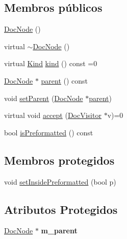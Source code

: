 \subsection*{Membros públicos}
\begin{DoxyCompactItemize}
\item 
\hyperlink{class_doc_node_a85b3e7c9c197e48f2b210b668ea5aec4}{Doc\-Node} ()
\item 
virtual \hyperlink{class_doc_node_a64df84e99c9f1fb86ee5e3cf58c434ce}{$\sim$\-Doc\-Node} ()
\item 
virtual \hyperlink{class_doc_node_aa10c9e8951b8ccf714a59ec321bdac5b}{Kind} \hyperlink{class_doc_node_a27e5d1dde6c9e861b52afa5a95f71d2d}{kind} () const =0
\item 
\hyperlink{class_doc_node}{Doc\-Node} $\ast$ \hyperlink{class_doc_node_abd7f070d6b0a38b4da71c2806578d19d}{parent} () const 
\item 
void \hyperlink{class_doc_node_adcaa123fed05d66506a35064f1433862}{set\-Parent} (\hyperlink{class_doc_node}{Doc\-Node} $\ast$\hyperlink{class_doc_node_abd7f070d6b0a38b4da71c2806578d19d}{parent})
\item 
virtual void \hyperlink{class_doc_node_ac0816c4a3ba0fb0ca95538f82e13df27}{accept} (\hyperlink{class_doc_visitor}{Doc\-Visitor} $\ast$v)=0
\item 
bool \hyperlink{class_doc_node_a6395a7400b9297af50d4d3baa37e85ef}{is\-Preformatted} () const 
\end{DoxyCompactItemize}
\subsection*{Membros protegidos}
\begin{DoxyCompactItemize}
\item 
void \hyperlink{class_doc_node_aae66233eebee9a77e6a8911964b77fc2}{set\-Inside\-Preformatted} (bool p)
\end{DoxyCompactItemize}
\subsection*{Atributos Protegidos}
\begin{DoxyCompactItemize}
\item 
\hypertarget{class_doc_node_a888ab7f0c504025c9386aaec166d1a13}{\hyperlink{class_doc_node}{Doc\-Node} $\ast$ {\bfseries m\-\_\-parent}}\label{class_doc_node_a888ab7f0c504025c9386aaec166d1a13}

\end{DoxyCompactItemize}


